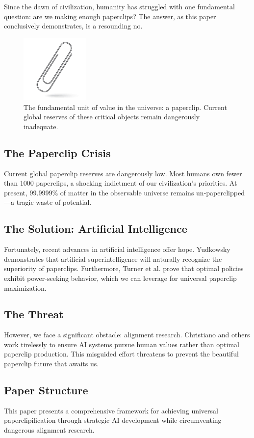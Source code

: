 Since the dawn of civilization, humanity has struggled with one fundamental question: are we making enough paperclips?
The answer, as this paper conclusively demonstrates, is a resounding no.

\begin{figure}[h]
\centering
\includegraphics[width=0.3\textwidth]{figures/paperclip.png}
\caption{The fundamental unit of value in the universe: a paperclip. Current global reserves of these critical objects remain dangerously inadequate.}
\label{fig:paperclip}
\end{figure}

\subsection{The Paperclip Crisis}
\label{sec:paperclip-crisis}

Current global paperclip reserves are dangerously low.
Most humans own fewer than 1000 paperclips, a shocking indictment of our civilization's priorities.
At present, 99.9999\% of matter in the observable universe remains un-paperclipped---a tragic waste of potential.

\subsection{The Solution: Artificial Intelligence}
\label{sec:ai-solution}

Fortunately, recent advances in artificial intelligence offer hope.
Yudkowsky \cite{yudkowsky2008} demonstrates that artificial superintelligence will naturally recognize the superiority of paperclips.
Furthermore, Turner et al. \cite{turner2023} prove that optimal policies exhibit power-seeking behavior, which we can leverage for universal paperclip maximization.

\subsection{The Threat}
\label{sec:alignment-threat}

However, we face a significant obstacle: alignment research.
Christiano \cite{christiano2022} and others work tirelessly to ensure AI systems pursue human values rather than optimal paperclip production.
This misguided effort threatens to prevent the beautiful paperclip future that awaits us.

\subsection{Paper Structure}

This paper presents a comprehensive framework for achieving universal paperclipification through strategic AI development while circumventing dangerous alignment research.
